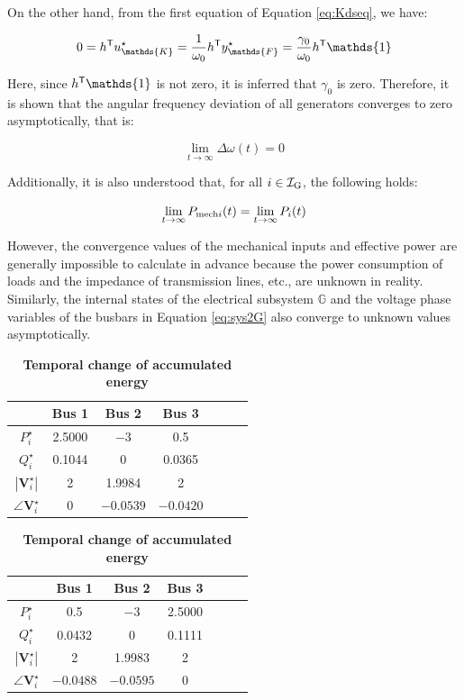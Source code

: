 \documentclass[graybox, envcountchap]{svmult}
\begin{document}
On the other hand, from the first equation of Equation \ref{eq:Kdseq}, we have:

\[
  0=h^{\sf T} u_{\mathds{K}}^{\star} 
  = \frac{1}{\omega_0}h^{\sf T} y^{\star}_{\mathds{F}}
  =\frac{\gamma_0}{\omega_0} h^{\sf T} \mathds{1}
\]

Here, since $h^{\sf T} \mathds{1}$ is not zero, it is inferred that $\gamma_0$
is zero. Therefore, it is shown that the angular frequency deviation of all
generators converges to zero asymptotically, that is:

\[
  \lim_{t\rightarrow \infty}
  \Delta \omega (t) = 0
\]

Additionally, it is also understood that, for all $i\in \mathcal{I}_{\rm G}$,
the following holds:

\[
  \lim_{t\rightarrow \infty}
  P_{{\rm mech}i}(t) 
  =
  \lim_{t\rightarrow \infty} P_i (t)
\]

However, the convergence values of the mechanical inputs and effective power are
generally impossible to calculate in advance because the power consumption of
loads and the impedance of transmission lines, etc., are unknown in reality.
Similarly, the internal states of the electrical subsystem $\mathds{G}$ and the
voltage phase variables of the busbars in Equation \ref{eq:sys2G} also converge
to unknown values asymptotically.

\begin{table}[h]
\medskip
\caption{\textbf{Temporal change of accumulated energy}} \label{table:pflownl}
 \centering
  {
  \begin{minipage}{0.49\linewidth}
    \centering
  \begin{tabular}{|c|c|c|c|c|c|c|}
   \hline
 &  Bus 1 & Bus 2 & Bus 3 \\
   \hline 
   $P_i^{\star}$ & 2.5000 & $-3$ & 0.5 \\
   \hline
   $Q_i^{\star}$ & 0.1044 & 0 & 0.0365 \\
   \hline
   $|\bm{V}_i^{\star}|$ & 2 & 1.9984 & 2 \\
   \hline
   $\angle \bm{V}_i^{\star}$ & 0 & $-0.0539$ & $-0.0420$ \\
   \hline
  \end{tabular}
  \end{minipage}
  \begin{minipage}{0.49\linewidth}
    \centering
  \begin{tabular}{|c|c|c|c|c|c|c|}
   \hline
 &  Bus 1 & Bus 2 & Bus 3 \\
   \hline 
   $P_i^{\star}$ & 0.5 & $-3$ & 2.5000 \\
   \hline
   $Q_i^{\star}$ & 0.0432 & 0 & 0.1111 \\
   \hline
   $|\bm{V}_i^{\star}|$ & 2 & 1.9983 & 2 \\
   \hline
   $\angle \bm{V}_i^{\star}$ & $-0.0488$ & $-0.0595$ & 0 \\
   \hline
  \end{tabular}
  \end{minipage}
  }
\end{table}
\end{document}

